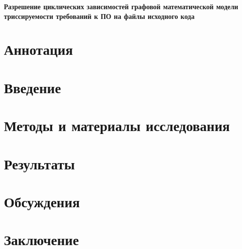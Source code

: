 \documentclass{article}
\begin{document}
    \begin{center}
    \large
    \textbf{Разрешение циклических зависимостей графовой математической модели триссируемости требований к ПО на файлы исходного кода}



    \end{center}

    \tableofcontents
    \newpage

    \section{Аннотация}
    

    \section{Введение}
    

    \section{Методы и материалы исследования}
    

    \section{Результаты}
    

    \section{Обсуждения}
    

    \section{Заключение}
    
\end{document}
